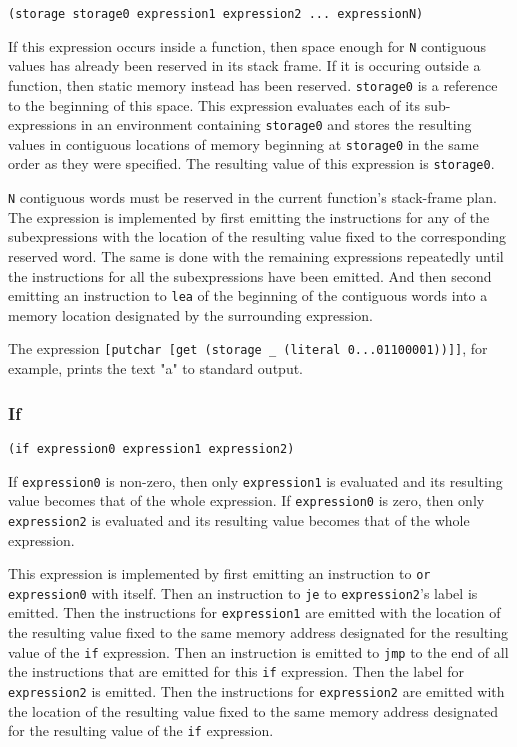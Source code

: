 \documentclass[]{article}
\begin{document}
\begin{verbatim}
(storage storage0 expression1 expression2 ... expressionN)
\end{verbatim}

If this expression occurs inside a function, then space enough for
\texttt{N} contiguous values has already been reserved in its stack
frame. If it is occuring outside a function, then static memory instead
has been reserved. \texttt{storage0} is a reference to the beginning of
this space. This expression evaluates each of its sub-expressions in an
environment containing \texttt{storage0} and stores the resulting values
in contiguous locations of memory beginning at \texttt{storage0} in the
same order as they were specified. The resulting value of this
expression is \texttt{storage0}.

\texttt{N} contiguous words must be reserved in the current function's
stack-frame plan. The expression is implemented by first emitting the
instructions for any of the subexpressions with the location of the
resulting value fixed to the corresponding reserved word. The same is
done with the remaining expressions repeatedly until the instructions
for all the subexpressions have been emitted. And then second emitting
an instruction to \texttt{lea} of the beginning of the contiguous words
into a memory location designated by the surrounding expression.

The expression
\texttt{{[}putchar\ {[}get\ (storage\ \_\ (literal\ 0...01100001)){]}{]}},
for example, prints the text "a" to standard output.

\hypertarget{if}{%
\subsubsection{If}\label{if}}

\begin{verbatim}
(if expression0 expression1 expression2)
\end{verbatim}

If \texttt{expression0} is non-zero, then only \texttt{expression1} is
evaluated and its resulting value becomes that of the whole expression.
If \texttt{expression0} is zero, then only \texttt{expression2} is
evaluated and its resulting value becomes that of the whole expression.

This expression is implemented by first emitting an instruction to
\texttt{or} \texttt{expression0} with itself. Then an instruction to
\texttt{je} to \texttt{expression2}'s label is emitted. Then the
instructions for \texttt{expression1} are emitted with the location of
the resulting value fixed to the same memory address designated for the
resulting value of the \texttt{if} expression. Then an instruction is
emitted to \texttt{jmp} to the end of all the instructions that are
emitted for this \texttt{if} expression. Then the label for
\texttt{expression2} is emitted. Then the instructions for
\texttt{expression2} are emitted with the location of the resulting
value fixed to the same memory address designated for the resulting
value of the \texttt{if} expression.
\end{document}
